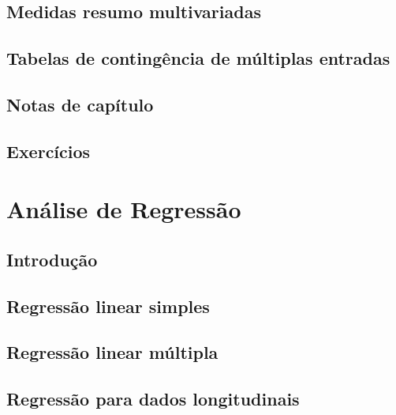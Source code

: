 \documentclass[
]{latex/krantz}
\theoremstyle{definition}
\theoremstyle{definition}
\theoremstyle{definition}
\theoremstyle{definition}
\theoremstyle{remark}
\begin{document}
\hypertarget{medidas-resumo-multivariadas}{%
\section{Medidas resumo multivariadas}\label{medidas-resumo-multivariadas}}

\hypertarget{tabelas-de-continguxeancia-de-muxfaltiplas-entradas}{%
\section{Tabelas de contingência de múltiplas entradas}\label{tabelas-de-continguxeancia-de-muxfaltiplas-entradas}}

\hypertarget{notas-de-capuxedtulo-3}{%
\section{Notas de capítulo}\label{notas-de-capuxedtulo-3}}

\hypertarget{exercuxedcios-3}{%
\section{Exercícios}\label{exercuxedcios-3}}

\hypertarget{anuxe1lise-de-regressuxe3o}{%
\chapter{Análise de Regressão}\label{anuxe1lise-de-regressuxe3o}}

\hypertarget{introduuxe7uxe3o-4}{%
\section{Introdução}\label{introduuxe7uxe3o-4}}

\hypertarget{regressuxe3o-linear-simples}{%
\section{Regressão linear simples}\label{regressuxe3o-linear-simples}}

\hypertarget{regressuxe3o-linear-muxfaltipla}{%
\section{Regressão linear múltipla}\label{regressuxe3o-linear-muxfaltipla}}

\hypertarget{regressuxe3o-para-dados-longitudinais}{%
\section{Regressão para dados longitudinais}\label{regressuxe3o-para-dados-longitudinais}}
\end{document}
